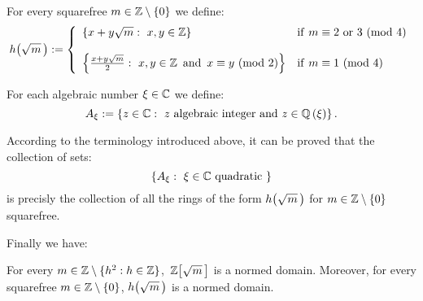 \begin{defn}\label{h(sqrt(m))-definition}
For every squarefree $m \in \Zzero$ we define:
$$
\hh{m} :=
\left\{ \begin{array}{ll}

\left\{ x + y\sqrt{m} :\ x,y \in \Z \right\} &
    \mathrm{if}\ m \congruent 2\ \mathrm{or}\ 3
    \mathrm{\ (mod\ 4)}

\\ %
\\ %

\left\{ \frac{x + y\sqrt{m}}{2}:\ x,y \in \Z\ \,
   \mathrm{and}\ \, x \congruent y
   \mathrm{\ (mod\ 2)}\right\} &
   \mathrm{if}\ m \congruent 1\ \mathrm{(mod\ 4)} 

\end{array} \right.
$$
\end{defn}

For each algebraic number $\xi \in \mathbb{C}$ we define:
$$
A_{\xi}:= \left\{ z \in \mathbb{C}:\ z
\textrm{ algebraic integer and } z \in \mathbb{Q}\left(\xi\right) \right\}.
$$

According to the terminology introduced above, it can be
proved that the collection of sets:
$$
\left\{A_{\xi}:\ \xi \in \mathbb{C} \textrm{ quadratic }\right\}
$$
is precisly the collection of all the rings of the form $\hh{m}$
for $m \in \mathbb{Z}\setminus\left\{0\right\}$ squarefree.

\medskip
Finally we have:
\begin{thm}
For every $m \in \mathbb{Z}\setminus\{h^2: h\in\mathbb{Z}\}$,\, $\ZZ{m}$ is a normed domain.
Moreover, for every squarefree $m \in \mathbb{Z}\setminus\left\{0\right\}$,
$\hh{m}$ is a normed domain.
\end{thm}

